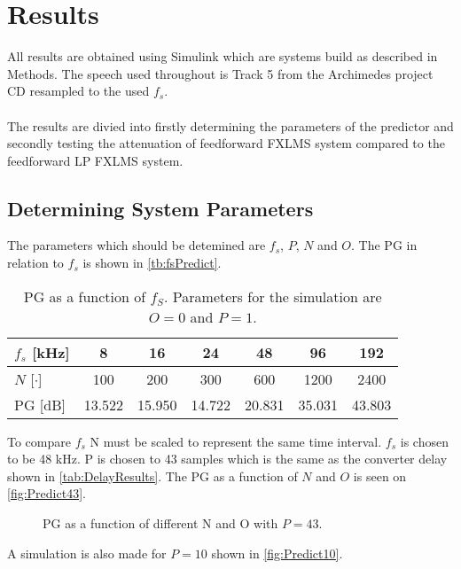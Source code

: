 \section{Results}
All results are obtained using Simulink\textsuperscript{\textregistered} which are systems build as described in Methods. The speech used throughout is Track 5 from the Archimedes project CD resampled to the used $f_s$.  
\\\\
The results are divied into firstly determining the parameters of the predictor and secondly testing the attenuation of feedforward FXLMS system compared to the feedforward LP FXLMS system.   

\subsection{Determining System Parameters}
The parameters which should be detemined are $f_s$, $P$, $N$ and $O$.         
The PG in relation to $f_s$ is shown in \autoref{tb:fsPredict}.

\begin{table}[H]
\centering
\begin{tabular}{|l|c|c|c|c|c|c|}
\hline
$f_s$ {[}kHz{]} & 8 & 16 & 24 & 48 & 96 & 192 \\ \hline 
$N$ {[}$\cdot${]} & 100 & 200 & 300 & 600 & 1200 & 2400 \\ \hline 
PG {[}dB{]} & 13.522 & 15.950 & 14.722 & 20.831 & 35.031 & 43.803 \\ \hline
\end{tabular}
\caption{PG as a function of $f_S$. Parameters for the simulation are $O=0$ and $P=1$.}
\label{tb:fsPredict}
\end{table}

To compare $f_s$ N must be scaled to represent the same time interval. $f_s$ is chosen to be 48 kHz. P is chosen to 43 samples which is the same as the converter delay shown in \autoref{tab:DelayResults}.  
The PG as a function of $N$ and $O$ is seen on \autoref{fig:Predict43}. 

\begin{figure}[H]
	\centering
	
	\caption{PG as a function of different N and O with $P=43$.}
	\label{fig:Predict43}
\end{figure}

A simulation is also made for $P=10$ shown in \autoref{fig:Predict10}.

